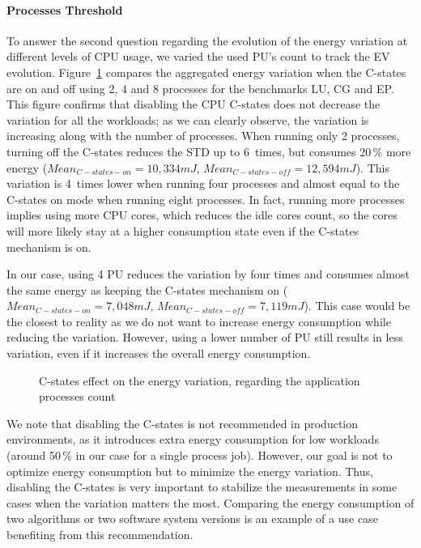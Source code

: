 \paragraph{Processes Threshold}
To answer the second question regarding the evolution of the energy variation at different levels of CPU usage, we varied the used PU's count to track the EV evolution.
Figure~\ref{fig:process-tresh} compares the aggregated energy variation when the C-states are on and off using 2, 4 and 8 processes for the benchmarks \textsf{LU}, \textsf{CG} and \textsf{EP}.
This figure confirms that disabling the CPU C-states does not decrease the variation for all the workloads; as we can clearly observe, the variation is increasing along with the number of processes.
When running only 2 processes, turning off the C-states reduces the STD up to 6~times, but consumes 20\,\% more energy ($Mean_{C-states-on}=10,334 mJ$, $Mean_{C-states-off}=12,594 mJ$).
This variation is 4~times lower when running four processes and almost equal to the \textsf{C-states on} mode when running eight processes.
In fact, running more processes implies using more CPU cores, which reduces the idle cores count, so the cores will more likely stay at a higher consumption state even if the C-states mechanism is on.

In our case, using 4 PU reduces the variation by four times and consumes almost the same energy as keeping the C-states mechanism on ($Mean_{C-states-on}=7,048 mJ$, $Mean_{C-states-off}=7,119 mJ$).
This case would be the closest to reality as we do not want to increase energy consumption while reducing the variation. However, using a lower number of PU still results in less variation, even if it increases the overall energy consumption.

\begin{figure}
    \caption{C-states effect on the energy variation, regarding the application processes count}\label{fig:process-tresh}
\end{figure}

We note that disabling the C-states is not recommended in production environments, as it introduces extra energy consumption for low workloads (around 50\,\% in our case for a single process job).
However, our goal is not to optimize energy consumption but to minimize the energy variation.
Thus, disabling the C-states is very important to stabilize the measurements in some cases when the variation matters the most.
Comparing the energy consumption of two algorithms or two software system versions is an example of a use case benefiting from this recommendation.

